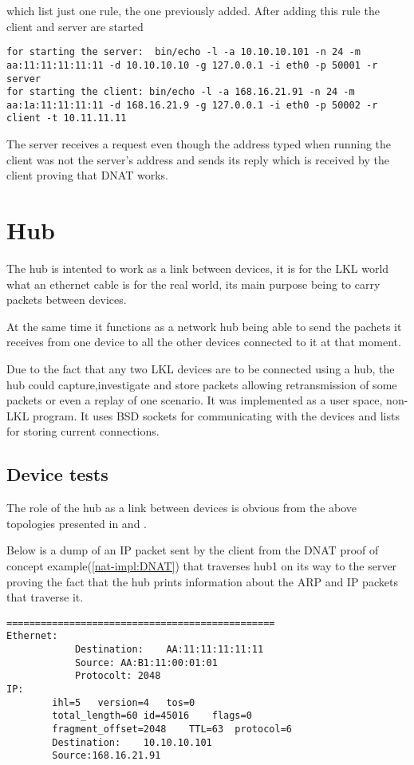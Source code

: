 {{\begin{itemize}
which list just one rule, the one previously added. 
After adding this rule the client and server are started
\lstset{language=TeX, caption=SNAT-starting client and server applications}
\begin{lstlisting}
for starting the server:  bin/echo -l -a 10.10.10.101 -n 24 -m aa:11:11:11:11:11 -d 10.10.10.10 -g 127.0.0.1 -i eth0 -p 50001 -r server
for starting the client: bin/echo -l -a 168.16.21.91 -n 24 -m aa:1a:11:11:11:11 -d 168.16.21.9 -g 127.0.0.1 -i eth0 -p 50002 -r client -t 10.11.11.11
\end{lstlisting}
 The server receives a request even though the address typed when running the client was not the server's address and sends its reply which is received by the client proving that DNAT works.

\section{Hub}
\label{sec:hub:impl}

The hub is intented to work as a link between devices, it is for the LKL world what an ethernet cable is for the real world, its main purpose being to carry packets between devices.

At the same time it functions as a network hub being able to send the pachets it receives from one device to all the other devices connected to it at that moment.

Due to the fact that any two LKL devices are to be connected using a hub, the hub could capture,investigate and store packets allowing retransmission of some packets or even a replay of one scenario.  
It was implemented as a user space, non-LKL program. It uses BSD sockets for communicating with the devices and lists for storing current connections.
\subsection{Device tests}
\label{sub-sec:router-tests}
The role of the hub as a link between devices is obvious from the above topologies presented in  and .

Below is a dump of an IP packet sent by the client from the DNAT proof of concept example(\ref{nat-impl:DNAT}) that traverses hub1 on its way to the server proving the fact that the hub prints information about the ARP and IP packets that traverse it.
\lstset{language=TeX, caption=Hub-print packet information}
\begin{lstlisting}
===============================================
Ethernet:
			Destination:	AA:11:11:11:11:11
			Source:	AA:B1:11:00:01:01
			Protocolt: 2048
IP:
		ihl=5	version=4	tos=0
		total_length=60	id=45016	flags=0
		fragment_offset=2048	TTL=63	protocol=6
		Destination:	10.10.10.101
		Source:168.16.21.91


\end{lstlisting}
\end{itemize}}}
